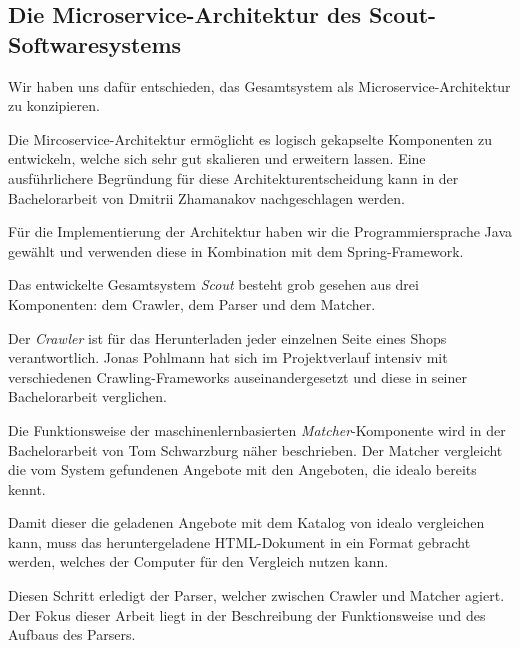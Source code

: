 \subsection{Die Microservice-Architektur des Scout-Softwaresystems}
\label{subsec:microservice-architektur}

Wir haben uns dafür entschieden, das Gesamtsystem als Microservice-Architektur zu konzipieren.

Die Mircoservice-Architektur ermöglicht es logisch gekapselte Komponenten zu entwickeln, welche sich sehr gut
skalieren und erweitern lassen.
Eine ausführlichere Begründung für diese Architekturentscheidung kann in der Bachelorarbeit von Dmitrii
Zhamanakov nachgeschlagen werden.\cite{thesis:dmitrii}

Für die Implementierung der Architektur haben wir die Programmiersprache Java gewählt und verwenden diese in
Kombination mit dem Spring-Framework\footnotemark.

Das entwickelte Gesamtsystem \textit{Scout} besteht grob gesehen aus drei Komponenten: dem Crawler, dem Parser und dem
Matcher.

Der \textit{Crawler} ist für das Herunterladen jeder einzelnen Seite eines Shops verantwortlich.
Jonas Pohlmann hat sich im Projektverlauf intensiv mit verschiedenen Crawling-Frameworks auseinandergesetzt und diese
in seiner Bachelorarbeit verglichen.\cite{thesis:jonas}

Die Funktionsweise der maschinenlernbasierten \textit{Matcher}-Komponente wird in der Bachelorarbeit von Tom
Schwarzburg näher beschrieben.\cite{thesis:tom}
Der Matcher vergleicht die vom System gefundenen Angebote mit den Angeboten, die idealo bereits kennt.

Damit dieser die geladenen Angebote mit dem Katalog von idealo vergleichen kann, muss das heruntergeladene
HTML-Dokument in ein Format gebracht werden, welches der Computer für den Vergleich nutzen kann.

Diesen Schritt erledigt der Parser, welcher zwischen Crawler und Matcher agiert.
Der Fokus dieser Arbeit liegt in der Beschreibung der Funktionsweise und des Aufbaus des Parsers.